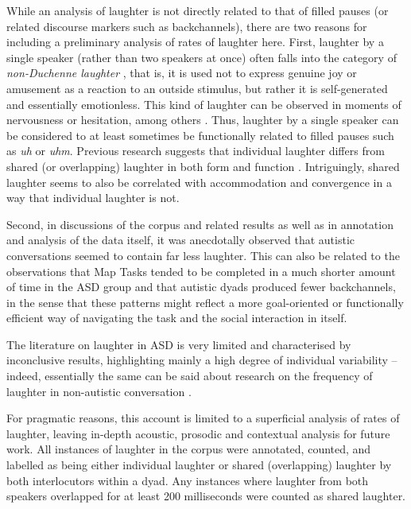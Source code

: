 While an analysis of laughter is not directly related to that of filled pauses (or related discourse markers such as backchannels), there are two reasons for including a preliminary analysis of rates of laughter here. First, laughter by a single speaker (rather than two speakers at once) often falls into the category of \textit{non-Duchenne laughter} \citep{gervaisEvolutionFunctionsLaughter2005,keltnerStudyLaughterDissociation1997,mehuSmilingLaughterNaturally2011}, that is, it is used not to express genuine joy or amusement as a reaction to an outside stimulus, but rather it is self-generated and essentially emotionless. This kind of laughter can be observed in moments of nervousness or hesitation, among others \citep{pietrowiczDimensionalAnalysisLaughter2019,ruchExpressivePatternLaughter2001}. Thus, laughter by a single speaker can be considered to at least sometimes be functionally related to filled pauses such as \emph{uh} or \emph{uhm}. Previous research suggests that individual laughter differs from shared (or overlapping) laughter in both form and function \citep{trouvainConvergenceLaughterConversational2012,trouvainExploringSequencesSpeech2013,trouvainLaughter2017,truongAcousticsOverlappingLaughter2012}. Intriguingly, shared laughter seems to also be correlated with accommodation and convergence in a way that individual laughter is not.

Second, in discussions of the corpus and related results as well as in annotation and analysis of the data itself, it was anecdotally observed that autistic conversations seemed to contain far less laughter. This can also be related to the observations that Map Tasks tended to be completed in a much shorter amount of time in the ASD group and that autistic dyads produced fewer backchannels, in the sense that these patterns might reflect a more goal-oriented or functionally efficient way of navigating the task and the social interaction in itself.

The literature on laughter in ASD is very limited and characterised by inconclusive results, highlighting mainly a high degree of individual variability \citep{hudenkoLaughterDiffersChildren2009,reddySharingHumourLaughter2002} -- indeed, essentially the same can be said about research on the frequency of laughter in non-autistic conversation \citep{trouvainLaughter2017,vettinLaughterConversationFeatures2004}.

For pragmatic reasons, this account is limited to a superficial analysis of rates of laughter, leaving in-depth acoustic, prosodic and contextual analysis for future work. All instances of laughter in the corpus were annotated, counted, and labelled  as being either individual laughter or shared (overlapping) laughter by both interlocutors within a dyad. Any instances where laughter from both speakers overlapped for at least 200 milliseconds were counted as shared laughter.

